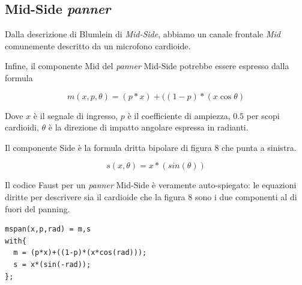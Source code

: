 \subsection{Mid-Side \emph{panner}}
\label{subsec:mspanner}

Dalla descrizione di Blumlein di \emph{Mid-Side}, abbiamo un canale frontale
\emph{Mid} comunemente descritto da un microfono cardioide.

Infine, il componente Mid del \emph{panner} Mid-Side potrebbe essere espresso dalla
formula

\begin{equation}
m(x,p,\theta) = (p*x) + ((1-p)*(x\cos\theta)
\label{eq:mid}
\end{equation}

Dove $ x $ è il segnale di ingresso, $ p $ è il coefficiente di ampiezza, $0.5$
per scopi cardioidi, $\theta$ è la direzione di impatto angolare espressa in
radianti.

Il componente Side è la formula dritta bipolare di figura 8 che punta a sinistra.

\begin{equation}
s(x,\theta) = x*(sin(\theta))
\label{eq:side}
\end{equation}

Il codice Faust per un \emph{panner} Mid-Side è veramente auto-spiegato: le equazioni
diritte per descrivere sia il cardioide che la figura 8 sono i due componenti
al di fuori del panning.

\begin{lstlisting}
mspan(x,p,rad) = m,s
with{
  m = (p*x)+((1-p)*(x*cos(rad)));
  s = x*(sin(-rad));
};
\end{lstlisting}

